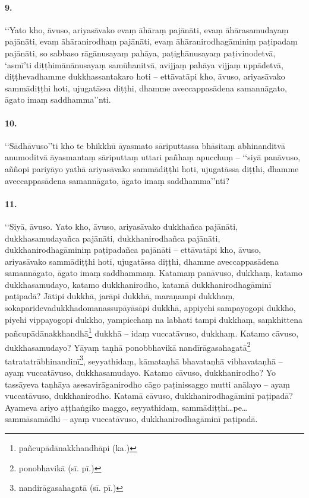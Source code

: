 \paragraph{9.} ‘‘Yato kho, āvuso, ariyasāvako evaṃ āhāraṃ pajānāti, evaṃ āhārasamudayaṃ pajānāti, evaṃ āhāranirodhaṃ pajānāti, evaṃ āhāranirodhagāminiṃ paṭipadaṃ pajānāti, so sabbaso rāgānusayaṃ pahāya, paṭighānusayaṃ paṭivinodetvā, ‘asmī’ti diṭṭhimānānusayaṃ samūhanitvā, avijjaṃ pahāya vijjaṃ uppādetvā, diṭṭhevadhamme dukkhassantakaro hoti – ettāvatāpi kho, āvuso, ariyasāvako sammādiṭṭhi hoti, ujugatāssa diṭṭhi, dhamme aveccappasādena samannāgato, āgato imaṃ saddhamma’’nti.

\paragraph{10.} ‘‘Sādhāvuso’’ti kho te bhikkhū āyasmato sāriputtassa bhāsitaṃ abhinanditvā anumoditvā āyasmantaṃ sāriputtaṃ uttari pañhaṃ apucchuṃ – ‘‘siyā panāvuso, aññopi pariyāyo yathā ariyasāvako sammādiṭṭhi hoti, ujugatāssa diṭṭhi, dhamme aveccappasādena samannāgato, āgato imaṃ saddhamma’’nti?

\paragraph{11.} ‘‘Siyā, āvuso. Yato kho, āvuso, ariyasāvako dukkhañca pajānāti, dukkhasamudayañca pajānāti, dukkhanirodhañca pajānāti, dukkhanirodhagāminiṃ paṭipadañca pajānāti – ettāvatāpi kho, āvuso, ariyasāvako sammādiṭṭhi hoti, ujugatāssa diṭṭhi, dhamme aveccappasādena samannāgato, āgato imaṃ saddhammaṃ. Katamaṃ panāvuso, dukkhaṃ, katamo dukkhasamudayo, katamo dukkhanirodho, katamā dukkhanirodhagāminī paṭipadā? Jātipi dukkhā, jarāpi dukkhā, maraṇampi dukkhaṃ, sokaparidevadukkhadomanassupāyāsāpi dukkhā, appiyehi sampayogopi dukkho, piyehi vippayogopi dukkho, yampicchaṃ na labhati tampi dukkhaṃ, saṃkhittena pañcupādānakkhandhā\footnote{pañcupādānakkhandhāpi (ka.)} dukkhā – idaṃ vuccatāvuso, dukkhaṃ. Katamo cāvuso, dukkhasamudayo? Yāyaṃ taṇhā ponobbhavikā nandīrāgasahagatā\footnote{ponobhavikā (sī. pī.)} tatratatrābhinandinī\footnote{nandirāgasahagatā (sī. pī.)}, seyyathidaṃ, kāmataṇhā bhavataṇhā vibhavataṇhā – ayaṃ vuccatāvuso, dukkhasamudayo. Katamo cāvuso, dukkhanirodho? Yo tassāyeva taṇhāya asesavirāganirodho cāgo paṭinissaggo mutti anālayo – ayaṃ vuccatāvuso, dukkhanirodho. Katamā cāvuso, dukkhanirodhagāminī paṭipadā? Ayameva ariyo aṭṭhaṅgiko maggo, seyyathidaṃ, sammādiṭṭhi…pe… sammāsamādhi – ayaṃ vuccatāvuso, dukkhanirodhagāminī paṭipadā.

